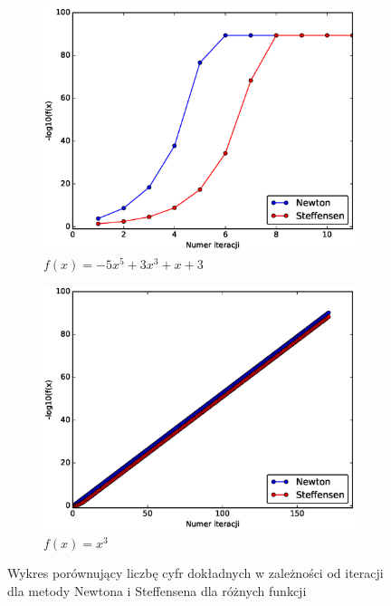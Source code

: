 \documentclass{article}
\begin{document}
\begin{figure}[h]
    \centering
    \begin{subfigure}[b]{0.45\textwidth}
        \includegraphics[width=\textwidth]{figure_1.eps}
        \caption{$f(x)=-5x^5+3x^3+x+3$}
        \label{w1a}
    \end{subfigure}
    \begin{subfigure}[b]{0.45\textwidth}
        \includegraphics[width=\textwidth]{figure_2.eps}
        \caption{$f(x)=x^3$}
        \label{w1b}
    \end{subfigure}
    \caption{Wykres porównujący liczbę cyfr dokładnych w zależności od iteracji dla metody Newtona i Steffensena dla różnych funkcji}
 	\label{w1}
\end{figure}
\end{document}
